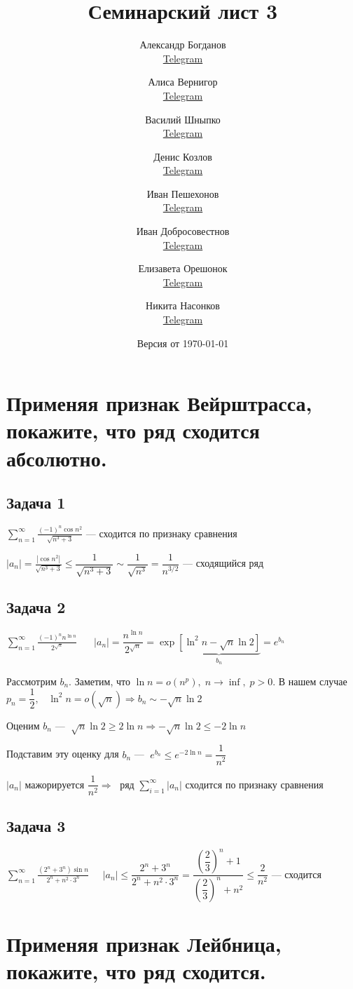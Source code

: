 \documentclass[a4paper,fleqn]{article}
\title{Семинарский лист 3}
\author{
	Александр Богданов \\ \href{https://t.me/SphericalPotatoInVacuum}{Telegram} \and
	Алиса Вернигор     \\ \href{https://t.me/allisyonok}{Telegram} \and
	Василий Шныпко     \\ \href{https://t.me/yourvash}{Telegram} \and
	Денис Козлов       \\ \href{https://t.me/DKozl50}{Telegram} \and
	Иван Пешехонов     \\ \href{https://t.me/JohanDDC}{Telegram}\and
	Иван Добросовестнов \\ \href{https://t.me/ivankot13}{Telegram}\and
	Елизавета Орешонок \\ \href{https://t.me/eaoresh}{Telegram}\and
	Никита Насонков \\ \href{https://t.me/nnv_nick}{Telegram}
}
\date{Версия от {\ddmmyyyydate\today} \currenttime}
\begin{document}
	\maketitle
	\section*{Применяя признак Вейрштрасса, покажите, что ряд сходится абсолютно.}
	\subsection*{Задача 1}
	$ \sum_{n=1}^{\infty} \frac{(-1)^{n} \cos n^{2}}{\sqrt{n^{3}+3}} $ --- сходится по признаку сравнения
	
	$ |a_n| = \frac{|\cos n^{2}|}{\sqrt{n^{3}+3}} \leq \dfrac{1}{\sqrt{n^{3}+3}} \sim \dfrac{1}{\sqrt{n^3}} = \dfrac{1}{n^{3/2}} $ --- сходящийся ряд
	
	\subsection*{Задача 2}
	$ \sum_{n=1}^{\infty} \frac{(-1)^{n} n^{\ln n}}{2^{\sqrt{n}}} $
	$\; \; \; \; \;  |a_n| = \dfrac{n^{\ln n}}{2^{\sqrt{n}}} = \exp \underbrace{\left[\ln^2 n - \sqrt{n}\ln 2\right]}_{b_n}  = e^{b_n}$
	
	Рассмотрим $ b_n $.
	Заметим, что $ \ln n  = o(n^p), \; n \to \inf, \; p>0$. В нашем случае $ p_n = \dfrac{1}{2}, \; \; \; \ln^2n = o(\sqrt{n}) \Rightarrow b_n \sim -\sqrt{n}\ln 2$ 
	
	Оценим $ b_n $   --- $ \; \sqrt{n}\ln2 \geq 2 \ln n \Rightarrow -\sqrt{n}\ln 2 \leq -2\ln n$
	
	Подставим эту оценку для $ b_n $ --- $\; e^{b_n} \leq e^{-2\ln n}  = \dfrac{1}{n^2}$ 
	
	$ |a_n| $ мажорируется $ \dfrac{1}{n^2} \Rightarrow \;$ ряд $ \sum_{i = 1}^{\infty} |a_n|$ сходится по признаку сравнения 
	
	\subsection*{Задача 3}
	$ \sum_{n=1}^{\infty} \frac{\left(2^{n}+3^{n}\right) \sin n}{2^{n}+n^{2} \cdot 3^{n}} \; \; \; \; \; |a_n| \leq \dfrac{2^n + 3^n}{2^n + n^2\cdot 3^n}  = \dfrac{\left(\dfrac{2}{3}\right)^n+1 }{\left(\dfrac{2}{3}\right)^n + n^2} \leq\dfrac{2}{n^2}$ --- сходится
	\section*{Применяя признак Лейбница, покажите, что ряд сходится.}
\end{document}
